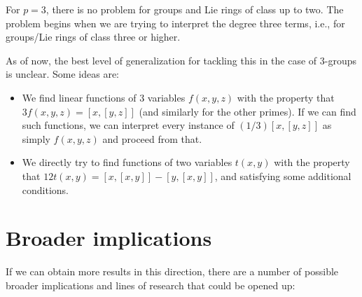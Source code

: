 \documentclass[10pt]{amsart}
\begin{document}
For $p = 3$, there is no problem for groups and Lie rings of class up
to two. The problem begins when we are trying to interpret the degree
three terms, i.e., for groups/Lie rings of class three or higher.

As of now, the best level of generalization for tackling this in the
case of $3$-groups is unclear. Some ideas are:

\begin{itemize}
\item We find linear functions of $3$ variables $f(x,y,z)$ with the
  property that $3f(x,y,z) = [x,[y,z]]$ (and similarly for the other
  primes). If we can find such functions, we can interpret every
  instance of $(1/3)[x,[y,z]]$ as simply $f(x,y,z)$ and proceed from that.
\item We directly try to find functions of two variables $t(x,y)$ with
  the property that $12t(x,y) = [x,[x,y]] - [y,[x,y]]$, and satisfying
  some additional conditions.
\end{itemize}

\section*{Broader implications}

If we can obtain more results in this direction, there are a number of
possible broader implications and lines of research that could be
opened up:
\end{document}
